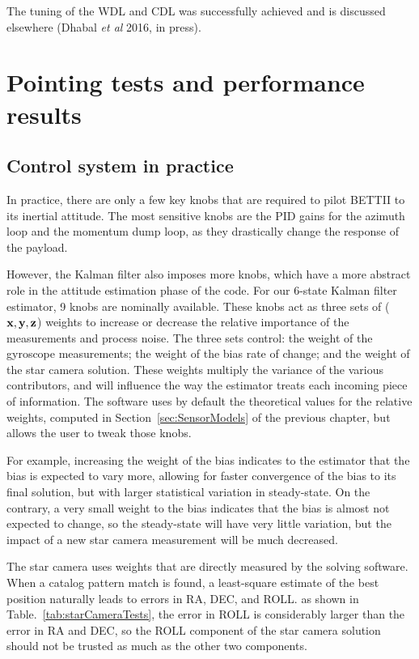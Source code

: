 The tuning of the WDL and CDL was successfully achieved and is discussed elsewhere (Dhabal \textit{et al} 2016, in press).



\section{Pointing tests and performance results}

\subsection{Control system in practice}

In practice, there are only a few key knobs that are required to pilot BETTII to its inertial attitude. The most sensitive knobs are the PID gains for the azimuth loop and the momentum dump loop, as they drastically change the response of the payload. 

However, the Kalman filter also imposes more knobs, which have a more abstract role in the attitude estimation phase of the code. For our 6-state Kalman filter estimator, 9 knobs are nominally available. These knobs act as three sets of ($\textrm{\textbf{x}}, \textrm{\textbf{y}}, \textrm{\textbf{z}}$) weights to increase or decrease the relative importance of the measurements and process noise. The three sets control: the weight of the gyroscope measurements; the weight of the bias rate of change; and the weight of the star camera solution. These weights multiply the variance of the various contributors, and will influence the way the estimator treats each incoming piece of information. The software uses by default the theoretical values for the relative weights, computed in Section~\ref{sec:SensorModels} of the previous chapter, but allows the user to tweak those knobs. 

For example, increasing the weight of the bias indicates to the estimator that the bias is expected to vary more, allowing for faster convergence of the bias to its final solution, but with larger statistical variation in steady-state. On the contrary, a very small weight to the bias indicates that the bias is almost not expected to change, so the steady-state will have very little variation, but the impact of a new star camera measurement will be much decreased. 

The star camera uses weights that are directly measured by the solving software. When a catalog pattern match is found, a least-square estimate of the best position naturally leads to errors in RA, DEC, and ROLL. as shown in Table.~\ref{tab:starCameraTests}, the error in ROLL is considerably larger than the error in RA and DEC, so the ROLL component of the star camera solution should not be trusted as much as the other two components. 

